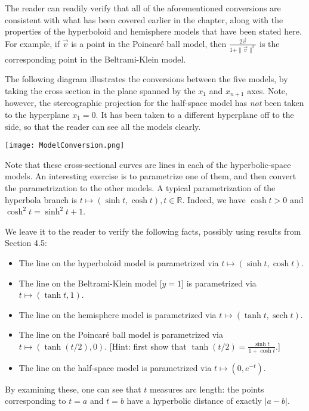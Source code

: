 \documentclass[leqno]{book}
\begin{document}
\noindent The reader can readily verify that all of the aforementioned conversions are consistent with what has been covered earlier in the chapter, along with the properties of the hyperboloid and hemisphere models that have been stated here.  For example, if $\vec v$ is a point in the Poincar\'e ball model, then $\frac{2\vec v}{1+\|\vec v\|^2}$ is the corresponding point in the Beltrami-Klein model.

The following diagram illustrates the conversions between the five models, by taking the cross section in the plane spanned by the $x_1$ and $x_{n+1}$ axes.  Note, however, the stereographic projection for the half-space model has \emph{not} been taken to the hyperplane $x_1=0$.  It has been taken to a different hyperplane off to the side, so that the reader can see all the models clearly.
\begin{center}
\texttt{[image: ModelConversion.png]}
\end{center}
Note that these cross-sectional curves are lines in each of the hyperbolic-space models.  An interesting exercise is to parametrize one of them, and then convert the parametrization to the other models.  A typical parametrization of the hyperbola branch is $t\mapsto(\sinh t,\cosh t),t\in\mathbb R$.  Indeed, we have $\cosh t>0$ and $\cosh^2t=\sinh^2t+1$.

We leave it to the reader to verify the following facts, possibly using results from Section 4.5:
\begin{itemize}
\item The line on the hyperboloid model is parametrized via $t\mapsto(\sinh t,\cosh t)$.

\item The line on the Beltrami-Klein model [$y=1$] is parametrized via $t\mapsto(\tanh t,1)$.

\item The line on the hemisphere model is parametrized via $t\mapsto(\tanh t,\operatorname{sech}t)$.

\item The line on the Poincar\'e ball model is parametrized via $t\mapsto(\tanh(t/2),0)$.  [Hint: first show that $\tanh(t/2)=\frac{\sinh t}{1+\cosh t}$.]

\item The line on the half-space model is parametrized via $t\mapsto(0,e^{-t})$.
\end{itemize}
By examining these, one can see that $t$ measures arc length: the points corresponding to $t=a$ and $t=b$ have a hyperbolic distance of exactly $|a-b|$.
\end{document}
